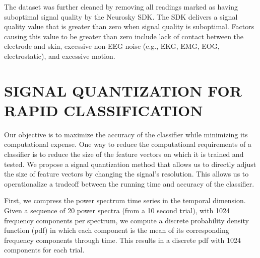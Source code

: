 The dataset was further cleaned by removing all readings marked as having suboptimal signal quality by the Neurosky SDK. The SDK delivers a signal quality value that is greater than zero when signal quality is suboptimal. Factors causing this value to be greater than zero include lack of contact between the electrode and skin, excessive non-EEG noise (e.g., EKG, EMG, EOG, electrostatic), and excessive motion.


\section{\uppercase{Signal Quantization For Rapid Classification}}
\label{sec:quantization}


\noindent Our objective is to maximize the accuracy of the classifier while minimizing its computational expense. One way to reduce the computational requirements of a classifier is to reduce the size of the feature vectors on which it is trained and tested. We propose a signal quantization method that allows us to directly adjust the size of feature vectors by changing the signal's resolution. This allows us to operationalize a tradeoff between the running time and accuracy of the classifier.



First, we compress the power spectrum time series in the temporal dimension. Given a sequence of 20 power spectra (from a 10 second trial), with 1024 frequency components per spectrum, we compute a discrete probability density function (pdf) in which each component is the mean of its corresponding frequency components through time. This results in a discrete pdf with 1024 components for each trial.

